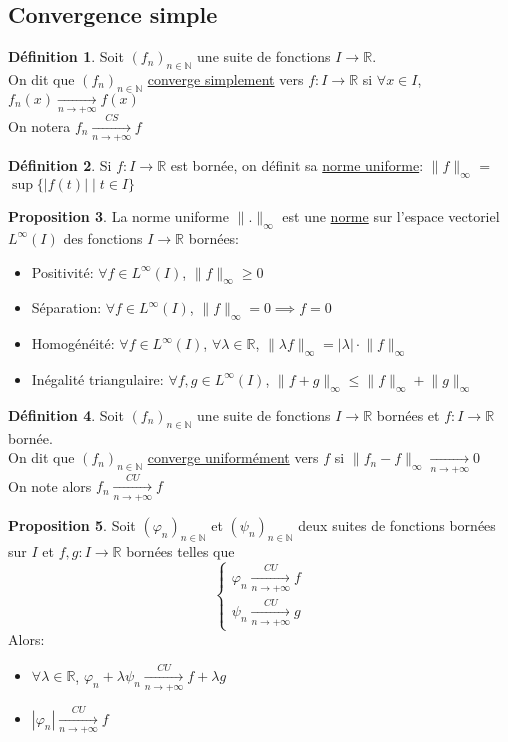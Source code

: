 \documentclass[10pt,a4paper]{article}
\theoremstyle{definition}
\newtheorem{proposition}{Proposition}[section]
\newtheorem{definition}[proposition]{Définition}
\begin{document}
\subsection{Convergence simple}

\begin{definition}
Soit $(f_n)_{n \in \mathbb{N}}$ une suite de fonctions $I \rightarrow \mathbb{R}$. \\
On dit que $(f_n)_{n \in \mathbb{N}}$ \uline{converge simplement} vers $f: I \to \mathbb{R}$ si $\forall x \in I$, $f_n(x) \xrightarrow[n \to +\infty]{} f(x)$ \\
On notera $f_n \xrightarrow[n \to +\infty]{CS} f$
\end{definition}
\begin{definition}
Si $f: I \to \mathbb{R}$ est bornée, on définit sa \uline{norme uniforme}: $ \lVert f \rVert_\infty$ = $\sup{\{ |f(t)| \mid t \in I \}}$
\end{definition}
\begin{proposition}
La norme uniforme $\lVert . \rVert_\infty$ est une \uline{norme} sur l'espace vectoriel $L^\infty(I)$ des fonctions $I \to \mathbb{R}$ bornées:
\begin{itemize}
\item Positivité: $\forall f \in L^\infty(I)$, $\lVert f \rVert_\infty \geq 0$
\item Séparation: $\forall f \in L^\infty(I)$, $\lVert f \rVert_\infty = 0 \implies f = 0$
\item Homogénéité: $\forall f \in L^\infty(I)$, $\forall \lambda \in \mathbb{R}$, $\lVert \lambda f \rVert_\infty = |\lambda| \cdot \lVert f \rVert_\infty$
\item Inégalité triangulaire: $\forall f, g \in L^\infty(I)$, $\lVert f + g \rVert_\infty \leq \lVert f \rVert_\infty + \lVert g \rVert_\infty$
\end{itemize}
\end{proposition}
\begin{definition}
Soit $(f_n)_{n \in \mathbb{N}}$ une suite de fonctions $I \to \mathbb{R}$ bornées et $f: I \to \mathbb{R}$ bornée. \\
On dit que $(f_n)_{n \in \mathbb{N}}$ \uline{converge uniformément} vers $f$ si $\lVert f_n - f \rVert_\infty \xrightarrow[n \to +\infty]{} 0$ \\
On note alors $f_n \xrightarrow[n \to +\infty]{CU} f$
\end{definition}
\begin{proposition}
Soit $(\varphi_n)_{n \in \mathbb{N}}$ et $(\psi_n)_{n \in \mathbb{N}}$  deux suites de fonctions bornées sur $I$ et $f, g: I \to \mathbb{R}$ bornées telles que
\[\begin{cases}\varphi_n \xrightarrow[n \to +\infty]{CU} f \\
\psi_n \xrightarrow[n \to +\infty]{CU} g
\end{cases}\]
Alors:
\begin{itemize}
\item $\forall \lambda \in \mathbb{R}$, $\varphi_n + \lambda \psi_n \xrightarrow[n \to +\infty]{CU} f + \lambda g$
\item $|\varphi_n| \xrightarrow[n \to +\infty]{CU} f$ 
\end{itemize} 
\end{proposition}
\end{document}
